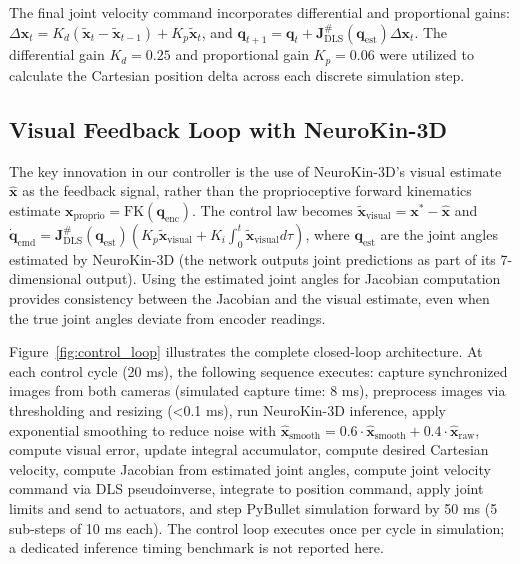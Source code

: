 \documentclass[12pt,a4paper,oneside]{report}
\begin{document}
The final joint velocity command incorporates differential and proportional gains: $\Delta \mathbf{x}_t = K_d (\tilde{\mathbf{x}}_t - \tilde{\mathbf{x}}_{t-1}) + K_p \tilde{\mathbf{x}}_t$, and $\mathbf{q}_{t+1} = \mathbf{q}_t + \mathbf{J}^{\#}_{\text{DLS}}(\mathbf{q}_{\text{est}}) \Delta \mathbf{x}_t$. The differential gain $K_d = 0.25$ and proportional gain $K_p = 0.06$ were utilized to calculate the Cartesian position delta across each discrete simulation step.

\subsection{Visual Feedback Loop with NeuroKin-3D}
\label{subsec:visual_feedback_loop_with_neurokin_3d}

The key innovation in our controller is the use of NeuroKin-3D's visual estimate $\hat{\mathbf{x}}$ as the feedback signal, rather than the proprioceptive forward kinematics estimate $\mathbf{x}_{\text{proprio}} = \text{FK}(\mathbf{q}_{\text{enc}})$. The control law becomes $\tilde{\mathbf{x}}_{\text{visual}} = \mathbf{x}^* - \hat{\mathbf{x}}$ and $\dot{\mathbf{q}}_{\text{cmd}} = \mathbf{J}^{\#}_{\text{DLS}}(\mathbf{q}_{\text{est}}) ( K_p \tilde{\mathbf{x}}_{\text{visual}} + K_i \int_0^t \tilde{\mathbf{x}}_{\text{visual}} d\tau )$, where $\mathbf{q}_{\text{est}}$ are the joint angles estimated by NeuroKin-3D (the network outputs joint predictions as part of its 7-dimensional output). Using the estimated joint angles for Jacobian computation provides consistency between the Jacobian and the visual estimate, even when the true joint angles deviate from encoder readings.

Figure~\ref{fig:control_loop} illustrates the complete closed-loop architecture. At each control cycle (20 ms), the following sequence executes: capture synchronized images from both cameras (simulated capture time: 8 ms), preprocess images via thresholding and resizing (<0.1 ms), run NeuroKin-3D inference, apply exponential smoothing to reduce noise with $\hat{\mathbf{x}}_{\text{smooth}} = 0.6 \cdot \hat{\mathbf{x}}_{\text{smooth}} + 0.4 \cdot \hat{\mathbf{x}}_{\text{raw}}$, compute visual error, update integral accumulator, compute desired Cartesian velocity, compute Jacobian from estimated joint angles, compute joint velocity command via DLS pseudoinverse, integrate to position command, apply joint limits and send to actuators, and step PyBullet simulation forward by 50 ms (5 sub-steps of 10 ms each). The control loop executes once per cycle in simulation; a dedicated inference timing benchmark is not reported here.
\end{document}
